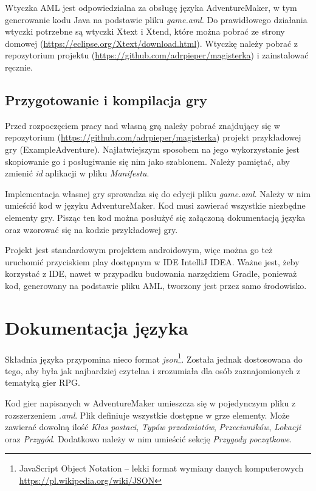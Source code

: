 \documentclass[openright]{xmgr}
\begin{document}
Wtyczka AML jest odpowiedzialna za obsługę języka AdventureMaker, w tym generowanie kodu Java na podstawie pliku \textit{game.aml}. Do prawidłowego działania wtyczki potrzebne są wtyczki Xtext i Xtend, które można pobrać ze strony domowej (\url{https://eclipse.org/Xtext/download.html}).
Wtyczkę należy pobrać z repozytorium projektu (\url{https://github.com/adrpieper/magisterka}) i zainstalować ręcznie.

\section{Przygotowanie i kompilacja gry}
Przed rozpoczęciem pracy nad własną grą należy pobrać znajdujący się w repozytorium (\url{https://github.com/adrpieper/magisterka}) projekt przykładowej gry (ExampleAdventure). Najłatwiejszym sposobem na jego wykorzystanie jest skopiowanie go i posługiwanie się nim jako szablonem. Należy pamiętać, aby zmienić \textit{id} aplikacji w pliku \textit{Manifestu}.

Implementacja własnej gry sprowadza się do edycji pliku \textit{game.aml}. Należy w nim umieścić kod w języku AdventureMaker. Kod musi  zawierać wszystkie niezbędne elementy gry. Pisząc ten kod można posłużyć się załączoną dokumentacją języka oraz wzorować się na kodzie przykładowej gry.

Projekt jest standardowym projektem androidowym, więc można go też uruchomić przyciskiem play dostępnym w IDE IntelliJ IDEA. Ważne jest, żeby korzystać z IDE, nawet w przypadku budowania narzędziem Gradle, ponieważ kod, generowany na podstawie pliku AML, tworzony jest przez samo środowisko.

\chapter{Dokumentacja języka} 

Składnia języka przypomina nieco format \textit{json}\footnote{JavaScript Object Notation -- lekki format wymiany danych komputerowych \url{https://pl.wikipedia.org/wiki/JSON}}. Została jednak dostosowana do tego, aby była jak najbardziej czytelna i zrozumiała dla osób zaznajomionych z tematyką gier RPG.

Kod gier napisanych w AdventureMaker umieszcza się w pojedynczym pliku z rozszerzeniem \textit{.aml}. Plik definiuje wszystkie dostępne w grze elementy. Może zawierać dowolną ilość \textit{Klas postaci}, \textit{Typów przedmiotów}, \textit{Przeciwników}, \textit{Lokacji} oraz \textit{Przygód}. Dodatkowo należy w nim umieścić sekcję \textit{Przygody początkowe}. 
\end{document}
